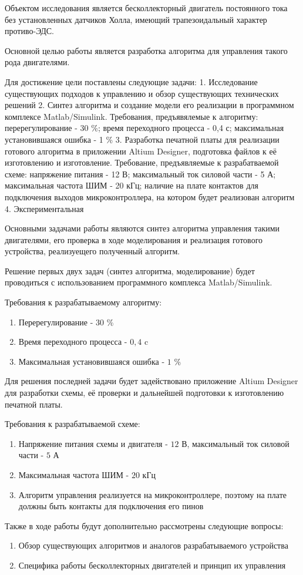 \TechTask
\thispagestyle{empty}
Объектом исследования является бесколлекторный двигатель постоянного тока без установленных датчиков Холла, имеющий трапезоидальный характер противо-ЭДС.

Основной целью работы является разработка алгоритма для управления такого рода двигателями.

Для достижение цели поставлены следующие задачи: 
 1. Исследование существующих подходов к управлению и обзор существующих технических решений
 2. Синтез алгоритма и создание модели его реализации в программном комплексе Matlab/Simulink. Требования, предъявялемые к алгоритму: перерегулирование - 30 \%; время переходного процесса - 0,4 с; максимальная установившаяся ошибка - 1 \%
 3. Разработка печатной платы для реализации готового алгоритма в приложении Altium Designer, подготовка файлов к её изготовлению и изготовление. Требование, предъявляемые к разрабатваемой схеме: напряжение питания - 12 В; максимальный ток силовой части - 5 А; максимальная частота ШИМ - 20 кГц; наличие на плате контактов для подключения выходов микроконтроллера, на котором будет реализован алгоритм
 4. Экспериментальная 

Основными задачами работы являются синтез алгоритма управления такими двигателями, его проверка в ходе моделирования и реализация готового устройства, реализуещего полученный алгоритм.

Решение первых двух задач (синтез алгоритма, моделирование) будет проводиться с использованием программного комплекса Matlab/Simulink.

Требования к разрабатываемому алгоритму:
\begin{enumerate}
	\item Перерегулирование - $30$ \%
	\item Время переходного процесса - $0,4$ c
	\item Максимальная установившаяся ошибка - $1$ \% 
\end{enumerate}

Для решения последней задачи будет задействовано приложение Altium Designer для разработки схемы, её проверки и дальнейшей подготовки к изготовлению печатной платы.

Требования к разрабатываемой схеме:
\begin{enumerate}
	\item Напряжение питания схемы и двигателя  - $12$ В, максимальный ток силовой части - $5$ А
	\item Максимальная частота ШИМ - $20$ кГц
	\item Алгоритм управления реализуется на микроконтроллере, поэтому на плате должны быть контакты для подключения его пинов
\end{enumerate}

Также в ходе работы будут дополнительно рассмотрены следующие вопросы:
\begin{enumerate}
	\item Обзор существующих алгоритмов и аналогов разрабатываемого устройства
	\item Специфика работы бесколлекторных двигателей и принцип их управления
\end{enumerate}


